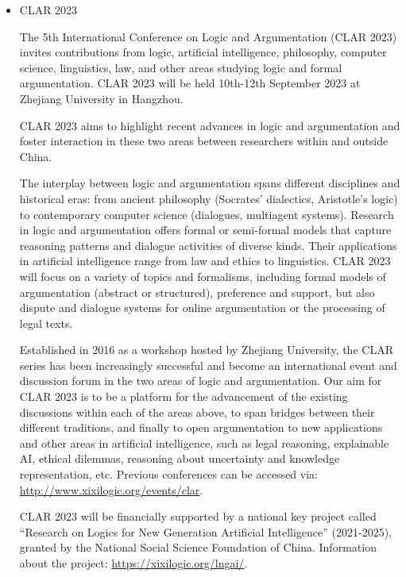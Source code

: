 \documentclass[prodmode,acmtecs]{acmsmall} %
\begin{document}
\begin{itemize}\item  CLAR 2023 
 
  The 5th International Conference on Logic and Argumentation (CLAR 2023) invites contributions from logic, artificial intelligence, philosophy, computer science, linguistics, law, and other areas studying logic and formal argumentation. CLAR 2023 will be held 10th-12th September 2023 at Zhejiang University in Hangzhou.  
 
  CLAR 2023 aims to highlight recent advances in logic and argumentation and foster interaction in these two areas between researchers within and outside China. 
 
   The interplay between logic and argumentation spans different disciplines and historical eras: from ancient philosophy (Socrates' dialectics, Aristotle's logic) to contemporary computer science (dialogues, multiagent systems). Research in logic and argumentation offers formal or semi-formal models that capture reasoning patterns and dialogue activities of diverse kinds. Their applications in artificial intelligence range from law and ethics to linguistics. CLAR 2023 will focus on a variety of topics and formalisms, including formal models of argumentation (abstract or structured), preference and support, but also dispute and dialogue systems for online argumentation or the processing of legal texts. 
 
  Established in 2016 as a workshop hosted by Zhejiang University, the CLAR series has been increasingly successful and become an international event and discussion forum in the two areas of logic and argumentation. Our aim for CLAR 2023 is to be a platform for the advancement of the existing discussions within each of the areas above, to span bridges between their different traditions, and finally to open argumentation to new applications and other areas in artificial intelligence, such as legal reasoning, explainable AI, ethical dilemmas, reasoning about uncertainty and knowledge representation, etc. Previous conferences can be accessed via: \href{http://www.xixilogic.org/events/clar}{http://www.xixilogic.org/events/clar}. 
 
  CLAR 2023 will be financially supported by a national key project called ``Research on Logics for New Generation Artificial Intelligence'' (2021-2025), granted by the National Social Science Foundation of China. Information about the project: \href{https://xixilogic.org/lngai/}{https://xixilogic.org/lngai/}. 
 

\end{itemize}
\end{document}
